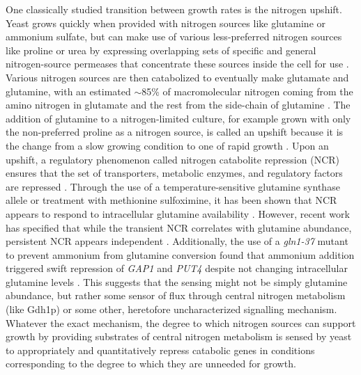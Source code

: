 One classically studied transition between growth rates is the 
nitrogen upshift. Yeast grows quickly when provided with nitrogen 
sources like glutamine or ammonium sulfate, but can make use of 
various less-preferred nitrogen sources like proline or urea by 
expressing overlapping sets of specific and general nitrogen-source 
permeases that concentrate these sources inside the cell for use
\parencite{grenson1992amino}.
Various
nitrogen sources are then catabolized to eventually make glutamate and
glutamine, with an estimated $\sim$85\% of macromolecular nitrogen coming
from the amino nitrogen in glutamate and the rest from the side-chain
of glutamine 
\parencite{magasanik2002nitrogen}. The addition of glutamine to
a nitrogen-limited culture, for example grown with only the
non-preferred proline as a nitrogen source, is called an upshift
because it is the change from a slow growing condition to one of rapid
growth \parencite{kjeldgaard1958transition,waldron1977synthesis}. 
Upon an upshift, a regulatory phenomenon called nitrogen
catabolite repression (NCR) ensures that the set of transporters,
metabolic enzymes, and regulatory factors are repressed
\parencite{cooper1982nitrogen,cooper2002transmitting,magasanik2002nitrogen}. 
Through the use of a temperature-sensitive glutamine synthase
allele or treatment with methionine sulfoximine, it has been shown
that NCR appears to respond to intracellular glutamine availability 
\parencite{grenson1983inactivation,stracka2014nitrogen,crespo2002tor}.
However, recent work has specified that while the transient NCR
correlates with glutamine abundance, persistent NCR appears independent
\parencite{fayyad2016yeast}. Additionally, the use of a
\textit{gln1-37} mutant to prevent ammonium from glutamine conversion
found that ammonium addition triggered swift repression of
\textit{GAP1} and \textit{PUT4} despite not changing intracellular
glutamine levels \parencite{ter1998repression}. 
This suggests that the sensing might not be
simply glutamine abundance, but rather some sensor of flux through 
central nitrogen metabolism (like Gdh1p) or some other,
heretofore uncharacterized signalling mechanism.
Whatever the exact mechanism, the degree to which nitrogen sources
can support growth by providing substrates of central nitrogen
metabolism is sensed by yeast to appropriately and quantitatively
repress catabolic genes in conditions corresponding to the degree
to which they are unneeded for growth.

